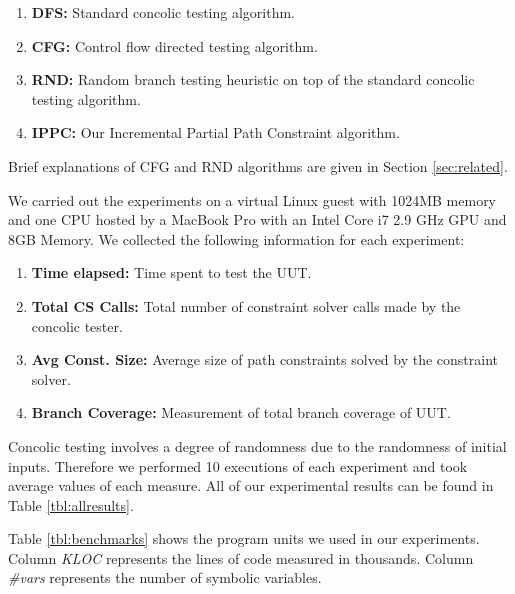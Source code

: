 \documentclass[EPiCempty]{easychair}
\begin{document}
\begin{enumerate}
\item \textbf{DFS:} Standard concolic testing algorithm.
\item \textbf{CFG:} Control flow directed testing algorithm. 
\item \textbf{RND:} Random branch testing heuristic on top of the standard concolic testing algorithm.
\item \textbf{IPPC:} Our Incremental Partial Path Constraint algorithm.
\end{enumerate}

Brief explanations of CFG and RND algorithms are given in Section \ref{sec:related}.

We carried out the experiments on a virtual Linux guest with 1024MB memory and one CPU hosted by a MacBook Pro with an Intel Core i7 2.9 GHz GPU and 8GB Memory. We collected the following information for each experiment:

\begin{enumerate}
\item \textbf{Time elapsed:} Time spent to test the UUT.
\item \textbf{Total CS Calls:} Total number of constraint solver calls made by the concolic tester.
\item \textbf{Avg Const. Size:} Average size of path constraints solved by the constraint solver. 
\item \textbf{Branch Coverage:} Measurement of total branch coverage of UUT. %
\end{enumerate}

Concolic testing involves a degree of randomness due to the randomness of initial inputs. Therefore we performed 10 executions of each experiment and took average values of each measure. All of our experimental results can be found in Table \ref{tbl:allresults}.

Table \ref{tbl:benchmarks} shows the program units we used in our experiments. Column \emph{KLOC} represents the lines of code measured in thousands. Column \emph{{\#}vars} represents the number of symbolic variables.
\end{document}

